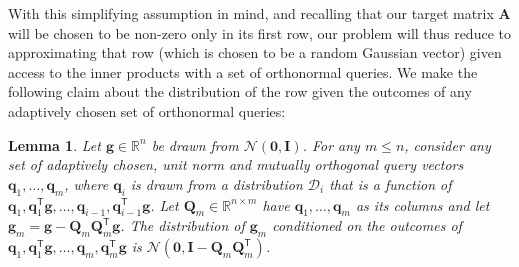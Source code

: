 \documentclass{article}[11pt]
\newtheorem{lemma}{Lemma}
\theoremstyle{definition}
\newcommand{\bv}[1]{\boldsymbol{\mathbf{#1}}}
\newcommand{\R}{\mathbb{R}}
\newcommand{\transpose}{\mathsf{T}}
\begin{document}
With this simplifying assumption in mind, and recalling that our target matrix $\bv{A}$ will be chosen to be non-zero only in its first row, our problem will thus reduce to approximating that row (which is chosen to be a random Gaussian vector) given access to the inner products with a set of orthonormal queries. We make the following claim about the distribution of the row given the outcomes of any adaptively chosen set of orthonormal queries:
\begin{lemma}
\label{lem:one_sided_hidden_gaussian}
Let $\bv{g} \in \R^n$ be drawn from $\mathcal{N}(\bv 0,\bv I)$. For any $m \leq n$, consider any set of adaptively chosen, unit norm and mutually orthogonal query vectors $\bv{q}_1, \ldots, \bv{q}_m$, where $\bv{q}_i$ is drawn from a distribution $\mathcal{D}_i$ that is a function of $\bv{q}_1, \bv{q}_1^\transpose \bv{g}, \ldots, \bv{q}_{i-1}, \bv{q}_{i-1}^\transpose \bv{g}$.
Let $\bv{Q}_m \in \R^{n \times m}$ have $\bv q_1,\ldots,\bv q_m$ as its columns and let $\bv{g}_m = \bv{g} - \bv{Q}_m\bv{Q}_m^\transpose \bv{g}$.
The distribution of $\bv{g}_m$ conditioned on the outcomes of 
$\bv{q}_1, \bv{q}_1^\transpose \bv{g}, \ldots, \bv{q}_{m}, \bv{q}_{m}^\transpose \bv{g}$ is $\mathcal{N}(\bv{0}, \bv{I} - \bv{Q}_m\bv{Q}_m^\transpose)$.
\end{lemma}
\end{document}
